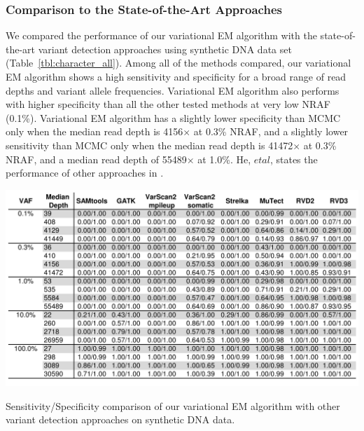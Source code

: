 \documentclass[11pt,reqno]{amsart}
\begin{document}
\subsubsection{Comparison to the State-of-the-Art Approaches}
We compared the performance of our variational EM algorithm with the state-of-the-art variant detection approaches using synthetic DNA data set (Table~\ref{tbl:character_all}).
Among all of the methods compared, our variational EM algorithm shows a high sensitivity and specificity for a broad range of read depths and variant allele frequencies.
Variational EM algorithm also performs with higher specificity than all the other tested methods at very low NRAF (0.1\%).
Variational EM algorithm has a slightly lower specificity than MCMC only when the median read depth is 4156$\times$ at 0.3\% NRAF, and a slightly lower sensitivity than MCMC only when the median read depth is 41472$\times$ at 0.3\% NRAF, and a median read depth of 55489$\times$ at 1.0\%.
He, $\mathit{et} \mathit{al}$, states the performance of other approaches in \citep{he2015rvd2}.
\begin{table}[htbp]
\centering
\includegraphics[width=1.0\textwidth]{tables/character_all.png}
\caption{Sensitivity/Specificity comparison of our variational EM algorithm with other variant detection approaches on synthetic DNA data.}
\vspace{-5pt}
\label{tbl:character_all}
\end{table}
\end{document}
